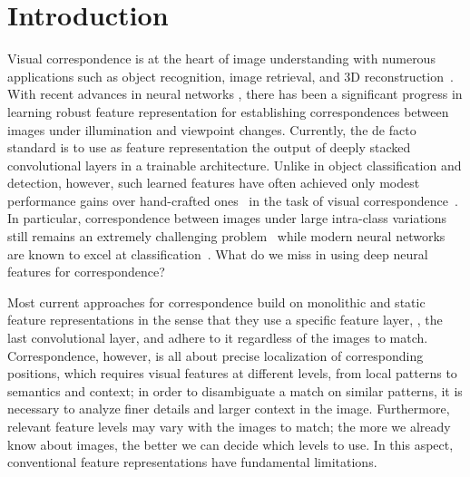 \documentclass[runningheads]{llncs}
\begin{document}
\section{Introduction}

Visual correspondence is at the heart of image understanding with numerous applications such as object recognition, image retrieval, and 3D reconstruction~\cite{forsyth:hal-01063327}. 
With recent advances in neural networks \cite{he2016deep,hu2017senet,huang2015dense,krizhevsky2012imagenet,simonyan2015vgg}, there has been a significant progress in learning robust feature representation for establishing correspondences between images under illumination and viewpoint changes. 
Currently, the de facto standard is to use as feature representation the output of deeply stacked convolutional layers in a trainable architecture.
Unlike in object classification and detection, however, such learned features have often achieved only modest performance gains over hand-crafted
ones~\cite{dalal2005histograms,lowe2004sift} in the task of visual correspondence~\cite{schonberger2017comparative}. 
In particular, correspondence between images under large intra-class variations still remains an extremely challenging problem~\cite{choy2016universal,fathy2018hierarchical,han2017scnet,jeon2018parn,kanazawa2016warpnet,kim2018recurrent,kim2017fcss,kim2017dctm,lee2019sfnet,long2014convnets,min2019hyperpixel,novotny2017anchornet,rocco17geocnn,rocco18weak,rocco2018neighbourhood,paul2018attentive,ufer2017deep,zhou2016learning} while modern neural networks are known to excel at classification~\cite{he2016deep,huang2015dense}.   
What do we miss in using deep neural features for correspondence? 

Most current approaches for correspondence build on monolithic and static feature representations 
in the sense that they use a specific feature layer, \eg, the last convolutional layer, and adhere to it regardless of the images to match. 
Correspondence, however, is all about precise localization of corresponding positions, which requires visual features at different levels, from local patterns to semantics and context; in order to disambiguate a match on similar patterns, it is necessary to analyze finer details and larger context in the image. 
Furthermore, relevant feature levels may vary with the images to match; the more we already know about images, the better we can decide which levels to use. In this aspect, conventional feature representations have fundamental limitations.
\end{document}
